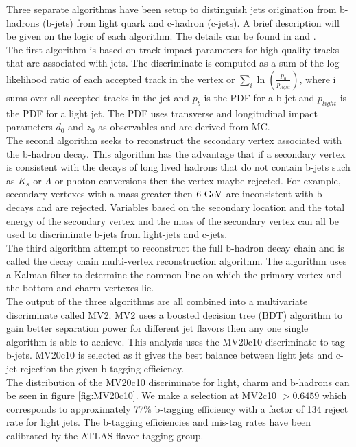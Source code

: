 \indent Three separate algorithms have been setup to distinguish jets origination from b-hadrons (b-jets) from light quark and c-hadron (c-jets).  A brief description will be given on the logic of each algorithm.  The details can be found in \cite{btagging2016}  and \cite{btagging2015}.  \\

\indent The first algorithm is based on track impact parameters for high quality tracks that are associated with jets.  The discriminate is computed as a sum of the log likelihood ratio of each accepted track in the vertex or $\sum_i \ln(\frac{p_b}{p_{light}})$, where i sums over all accepted tracks in the jet and $p_b$ is the PDF for a b-jet and $p_{light}$ is the PDF for a light jet.  The PDF uses transverse and longitudinal impact parameters $d_0$ and $z_0$ as observables and are derived from MC.  \\

\indent The second algorithm seeks to reconstruct the secondary vertex associated with the b-hadron decay.  This algorithm has the advantage that if a secondary vertex is consistent with the decays of long lived hadrons that do not contain b-jets such as $K_s$ or $\Lambda$ or photon conversions then the vertex maybe rejected.  For example, secondary vertexes with a mass greater then $6 \gev$ are inconsistent with b decays and are rejected. Variables based on the secondary location and the total energy of the secondary vertex and the mass of the secondary vertex can all be used to discriminate b-jets from light-jets and c-jets.  \\

\indent The third algorithm attempt to reconstruct the full b-hadron decay chain and is called the decay chain multi-vertex reconstruction algorithm.  The algorithm uses a Kalman filter to determine the common line on which the primary vertex and the bottom and charm vertexes lie.  \\

\indent The output of the three algorithms are all combined into a multivariate discriminate called MV2.  MV2 uses a boosted decision tree (BDT) algorithm \cite{TMVA} to gain better separation power for different jet flavors then any one single algorithm is able to achieve. This analysis uses the MV20c10 discriminate to tag b-jets. MV20c10 is selected as it gives the best balance between light jets and c-jet rejection the given b-tagging efficiency.  \\

\indent The distribution of the MV20c10 discriminate for light, charm and b-hadrons can be seen in figure \ref{fig:MV20c10}. We make a selection at MV2c10 $ > 0.6459$ which corresponds to approximately 77\% b-tagging efficiency with a factor of 134 reject rate for light jets.  The b-tagging efficiencies and mis-tag rates have been calibrated by the ATLAS flavor tagging group.\\

